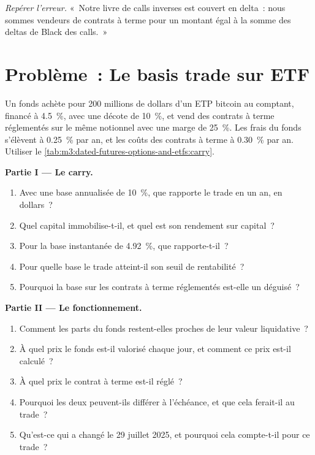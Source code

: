 \begin{exercise}[$\star\star\star$]\label{exo:m3:dated-futures-options-and-etfs:8}
\emph{Repérer l'erreur.} «~Notre livre de calls inverses est couvert en delta~: nous sommes vendeurs de contrats à terme pour un montant égal à la somme des deltas de Black des calls.~»
\end{exercise}

\section{Problème~: Le basis trade sur ETF}

\begin{problem}\label{pb:m3:dated-futures-options-and-etfs:1}
Un fonds achète pour 200 millions de dollars d'un ETP bitcoin au comptant, financé à 4.5~\%, avec une décote de 10~\%, et vend des contrats à terme réglementés sur le même notionnel
avec une marge de 25~\%. Les frais du fonds s'élèvent à 0.25~\% par an, et les coûts des contrats à terme à 0.30~\% par an. Utiliser le \cref{tab:m3:dated-futures-options-and-etfs:carry}.

\medskip\noindent\textbf{Partie I --- Le carry.}
\begin{enumerate}
\item Avec une base annualisée de 10~\%, que rapporte le trade en un an, en dollars~?
\item Quel capital immobilise-t-il, et quel est son rendement sur capital~?
\item Pour la base instantanée de 4.92~\%, que rapporte-t-il~?
\item Pour quelle base le trade atteint-il son seuil de rentabilité~?
\item Pourquoi la base sur les contrats à terme réglementés est-elle un  déguisé~?
\end{enumerate}

\medskip\noindent\textbf{Partie II --- Le fonctionnement.}
\begin{enumerate}[resume]
\item Comment les parts du fonds restent-elles proches de leur valeur liquidative~?
\item À quel prix le fonds est-il valorisé chaque jour, et comment ce prix est-il calculé~?
\item À quel prix le contrat à terme est-il réglé~?
\item Pourquoi les deux peuvent-ils différer à l'échéance, et que cela ferait-il au trade~?
\item Qu'est-ce qui a changé le 29 juillet 2025, et pourquoi cela compte-t-il pour ce trade~?
\end{enumerate}


\end{problem}
